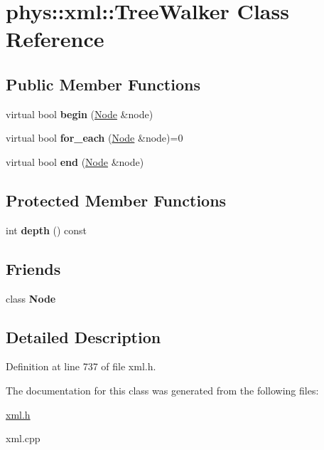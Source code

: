 \hypertarget{classphys_1_1xml_1_1TreeWalker}{
\section{phys::xml::TreeWalker Class Reference}
\label{d5/d8d/classphys_1_1xml_1_1TreeWalker}
}
\subsection*{Public Member Functions}
\begin{DoxyCompactItemize}
\item 
\hypertarget{classphys_1_1xml_1_1TreeWalker_a9f470ce9aa667b78a0281d5f87d09e0e}{
virtual bool {\bfseries begin} (\hyperlink{classphys_1_1xml_1_1Node}{Node} \&node)}
\label{d5/d8d/classphys_1_1xml_1_1TreeWalker_a9f470ce9aa667b78a0281d5f87d09e0e}

\item 
\hypertarget{classphys_1_1xml_1_1TreeWalker_a7fc883fd9b8eeff896c8822cf5b514d3}{
virtual bool {\bfseries for\_\-each} (\hyperlink{classphys_1_1xml_1_1Node}{Node} \&node)=0}
\label{d5/d8d/classphys_1_1xml_1_1TreeWalker_a7fc883fd9b8eeff896c8822cf5b514d3}

\item 
\hypertarget{classphys_1_1xml_1_1TreeWalker_a1486c30615d1de6622f997c28594aeae}{
virtual bool {\bfseries end} (\hyperlink{classphys_1_1xml_1_1Node}{Node} \&node)}
\label{d5/d8d/classphys_1_1xml_1_1TreeWalker_a1486c30615d1de6622f997c28594aeae}

\end{DoxyCompactItemize}
\subsection*{Protected Member Functions}
\begin{DoxyCompactItemize}
\item 
\hypertarget{classphys_1_1xml_1_1TreeWalker_ab2693802beae6312239507a679e2624a}{
int {\bfseries depth} () const }
\label{d5/d8d/classphys_1_1xml_1_1TreeWalker_ab2693802beae6312239507a679e2624a}

\end{DoxyCompactItemize}
\subsection*{Friends}
\begin{DoxyCompactItemize}
\item 
\hypertarget{classphys_1_1xml_1_1TreeWalker_a6db9d28bd448a131448276ee03de1e6d}{
class {\bfseries Node}}
\label{d5/d8d/classphys_1_1xml_1_1TreeWalker_a6db9d28bd448a131448276ee03de1e6d}

\end{DoxyCompactItemize}


\subsection{Detailed Description}


Definition at line 737 of file xml.h.



The documentation for this class was generated from the following files:\begin{DoxyCompactItemize}
\item 
\hyperlink{xml_8h}{xml.h}\item 
xml.cpp\end{DoxyCompactItemize}
